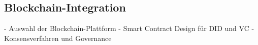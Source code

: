 \subsection{Blockchain-Integration} \label{sec:Blockchain-Integration}

- Auswahl der Blockchain-Plattform
- Smart Contract Design für DID und VC
- Konsensverfahren und Governance